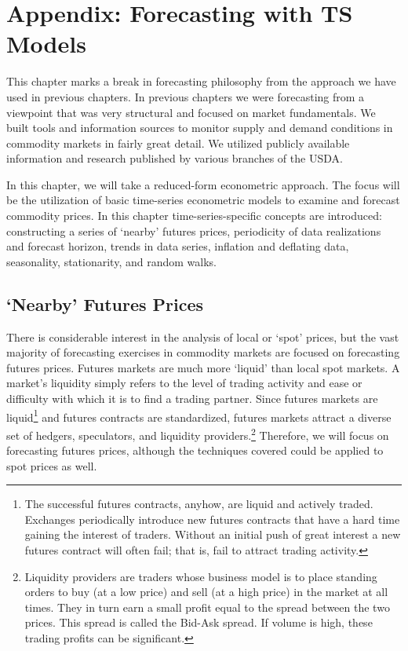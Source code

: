 \documentclass[
]{book}
\begin{document}
\hypertarget{appendix-forecasting-with-ts-models}{%
\chapter{Appendix: Forecasting with TS Models}\label{appendix-forecasting-with-ts-models}}

This chapter marks a break in forecasting philosophy from the approach we have used in previous chapters. In previous chapters we were forecasting from a viewpoint that was very structural and focused on market fundamentals. We built tools and information sources to monitor supply and demand conditions in commodity markets in fairly great detail. We utilized publicly available information and research published by various branches of the USDA.

In this chapter, we will take a reduced-form econometric approach. The focus will be the utilization of basic time-series econometric models to examine and forecast commodity prices. In this chapter time-series-specific concepts are introduced: constructing a series of `nearby' futures prices, periodicity of data realizations and forecast horizon, trends in data series, inflation and deflating data, seasonality, stationarity, and random walks.

\hypertarget{nearby-futures-prices}{%
\section{`Nearby' Futures Prices}\label{nearby-futures-prices}}

There is considerable interest in the analysis of local or `spot' prices, but the vast majority of forecasting exercises in commodity markets are focused on forecasting futures prices. Futures markets are much more `liquid' than local spot markets. A market's liquidity simply refers to the level of trading activity and ease or difficulty with which it is to find a trading partner. Since futures markets are liquid\footnote{The successful futures contracts, anyhow, are liquid and actively traded. Exchanges periodically introduce new futures contracts that have a hard time gaining the interest of traders. Without an initial push of great interest a new futures contract will often fail; that is, fail to attract trading activity.} and futures contracts are standardized, futures markets attract a diverse set of hedgers, speculators, and liquidity providers.\footnote{Liquidity providers are traders whose business model is to place standing orders to buy (at a low price) and sell (at a high price) in the market at all times. They in turn earn a small profit equal to the spread between the two prices. This spread is called the Bid-Ask spread. If volume is high, these trading profits can be significant.} Therefore, we will focus on forecasting futures prices, although the techniques covered could be applied to spot prices as well.
\end{document}
